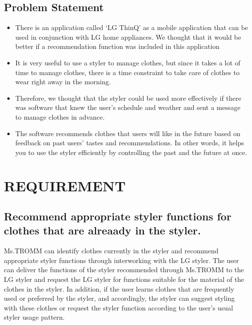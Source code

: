 \documentclass[conference]{IEEEtran}
\begin{document}
\subsection{Problem Statement}\label{SCM}
\begin{itemize}
\item There is an application called ‘LG ThinQ’ as a mobile application that can be used in conjunction with LG home appliances. We thought that it would be better if a recommendation function was included in this application
\item It is very useful to use a styler to manage clothes, but since it takes a lot of time to manage clothes, there is a time constraint to take care of clothes to wear right away in the morning.
\item Therefore, we thought that the styler could be used more effectively if there was software that knew the user’s schedule and weather and sent a message to manage clothes in advance.
\item The software recommends clothes that users will like in the future based on feedback on past users’ tastes and recommendations. In other words, it helps you to use the styler efficiently by controlling the past and the future at once.\\
\end{itemize}

\section{REQUIREMENT}

\subsection{Recommend appropriate styler functions for clothes that are alreaady in the styler.}
Ms.TROMM can identify clothes currently in the styler and recommend appropriate styler functions through interworking with the LG styler. The user can deliver the functions of the styler recommended through Ms.TROMM to the LG styler and request the LG styler for functions suitable for the material of the clothes in the styler. In addition, if the user learns clothes that are frequently used or preferred by the styler, and accordingly, the styler can suggest styling with these clothes or request the styler function according to the user’s usual styler usage pattern.\\
\end{document}
